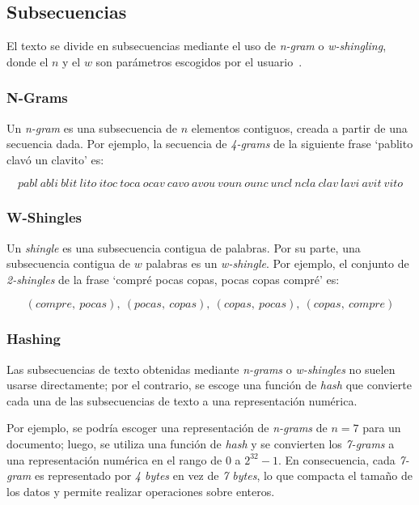 \subsection{Subsecuencias}

El texto se divide en subsecuencias mediante el uso de \textit{n-gram} o \textit{w-shingling},
donde el $n$ y el $w$ son parámetros escogidos por el usuario~\cite{Beth2014ACO}.

\subsubsection{N-Grams}

Un \textit{n-gram} es una subsecuencia de $n$ elementos contiguos,
creada a partir de una secuencia dada. Por ejemplo, 
la secuencia de \textit{4-grams} de la siguiente frase
‘pablito clavó un clavito’ es:

\begin{equation*}
pabl\ abli\ blit\ lito\ itoc\ toca\ ocav\ cavo\ avou\ voun\ ounc\ uncl\ ncla\ clav\ lavi\ avit\ vito
\end{equation*}

\subsubsection{W-Shingles}

Un \textit{shingle} es una subsecuencia contigua de palabras. 
Por su parte, una subsecuencia contigua de $w$ palabras es un \textit{w-shingle}.
Por ejemplo, el conjunto de \textit{2-shingles} de la frase ‘compré pocas copas, pocas copas compré’ es:

\begin{equation*}
(compre,\ pocas),\ (pocas,\ copas),\ (copas,\ pocas),\ (copas,\ compre)
\end{equation*}

\subsubsection{Hashing}

Las subsecuencias de texto obtenidas mediante \textit{n-grams}
o \textit{w-shingles} no suelen usarse directamente;
por el contrario, se escoge una función de \textit{hash} que convierte cada una de las
subsecuencias de texto a una representación numérica.

Por ejemplo, se podría escoger una representación de \textit{n-grams} de $n = 7$
para un documento; luego, se utiliza una función de \textit{hash} y 
se convierten los \textit{7-grams} a una representación numérica
en el rango de $0$ a $2^{32} - 1$. 
En consecuencia, cada \textit{7-gram} es representado por \textit{4 bytes} en vez de \textit{7 bytes},
lo que compacta el tamaño de los datos y permite realizar operaciones sobre enteros.

